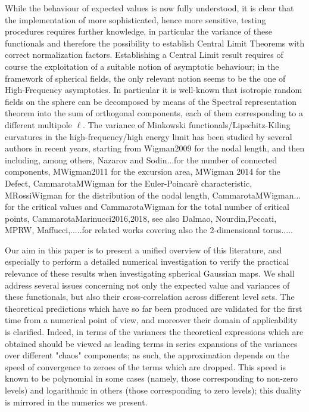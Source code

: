 \documentclass[aps,prd,showpacs,superscriptaddress,groupedaddress]{revtex4-1}  %
\begin{document}
While the behaviour of expected values is now fully understood, it is clear that the implementation of more sophisticated, hence more sensitive, testing procedures requires further knowledge, in particular the variance of these functionals and therefore the possibility to establish Central Limit Theorems with correct normalization factors. Establishing a Central Limit result requires of course the exploitation of a suitable notion of asymptotic behaviour; in the framework of spherical fields, the only relevant notion seems to be the one of High-Frequency asymptotics. In particular it is well-known that isotropic random fields on the sphere can be decomposed by means of the Spectral representation theorem into the sum of orthogonal components, each of them corresponding to a different multipole $\ell$. The variance of Minkowski functionals/Lipschitz-Kiling curvatures in the high-frequency/high energy limit has been studied by several authors in recent years, starting from Wigman2009 for the nodal length, and then including, among others, Nazarov and Sodin...for the number of connected components, MWigman2011 for the excursion area, MWigman 2014 for the Defect, CammarotaMWigman for the Euler-Poincarè characteristic, MRossiWigman for the distribution of the nodal length, CammarotaMWigman... for the critical values and CammarotaWigman for the total number of critical points, CammarotaMarinucci2016,2018, see also Dalmao, Nourdin,Peccati, MPRW, Maffucci,.....for related works covering also the 2-dimensional torus....\cite{cm1603}.


Our aim in this paper is to present a unified overview of this literature, and especially to perform a detailed numerical investigation to verify the practical relevance of these results when investigating spherical Gaussian maps. We shall address several issues concerning not only the expected value and variances of these functionals, but also their cross-correlation across different level sets. The theoretical predictions which have so far been produced are validated for the first time from a numerical point of view, and moreover their domain of applicability is clarified. Indeed, in terms of the variances the theoretical expressions which are obtained should be viewed as leading terms in series expansions of the variances over different "chaos" components; as such, the approximation depends on the speed of convergence to zeroes of the terms which are dropped. This speed is known to be polynomial in some cases (namely, those corresponding to non-zero levels) and logarithmic in others (those corresponding to zero levels); this duality is mirrored in the numerics we present.
\end{document}
